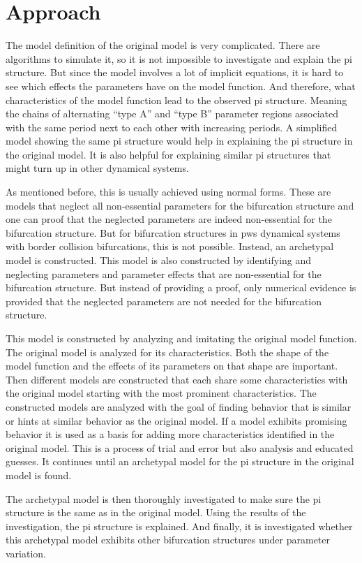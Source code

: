 \chapter{Approach}
\label{chap:approach}

The model definition of the original model is very complicated.
There are algorithms to simulate it, so it is not impossible to investigate and explain the \gls{pi} structure.
But since the model involves a lot of implicit equations, it is hard to see which effects the parameters have on the model function.
And therefore, what characteristics of the model function lead to the observed \gls{pi} structure.
Meaning the chains of alternating ``type A'' and ``type B'' parameter regions associated with the same period next to each other with increasing periods.
A simplified model showing the same \gls{pi} structure would help in explaining the \gls{pi} structure in the original model.
It is also helpful for explaining similar \gls{pi} structures that might turn up in other dynamical systems.

As mentioned before, this is usually achieved using normal forms.
These are models that neglect all non-essential parameters for the bifurcation structure and one can proof that the neglected parameters are indeed non-essential for the bifurcation structure.
But for bifurcation structures in \gls{pws} dynamical systems with border collision bifurcations, this is not possible.
Instead, an archetypal model is constructed.
This model is also constructed by identifying and neglecting parameters and parameter effects that are non-essential for the bifurcation structure.
But instead of providing a proof, only numerical evidence is provided that the neglected parameters are not needed for the bifurcation structure.

This model is constructed by analyzing and imitating the original model function.
The original model is analyzed for its characteristics.
Both the shape of the model function and the effects of its parameters on that shape are important.
Then different models are constructed that each share some characteristics with the original model starting with the most prominent characteristics.
The constructed models are analyzed with the goal of finding behavior that is similar or hints at similar behavior as the original model.
If a model exhibits promising behavior it is used as a basis for adding more characteristics identified in the original model.
This is a process of trial and error but also analysis and educated guesses.
It continues until an archetypal model for the \gls{pi} structure in the original model is found.

The archetypal model is then thoroughly investigated to make sure the \gls{pi} structure is the same as in the original model.
Using the results of the investigation, the \gls{pi} structure is explained.
And finally, it is investigated whether this archetypal model exhibits other bifurcation structures under parameter variation.
